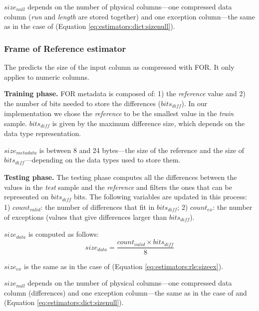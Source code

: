 \(size_{null}\) depends on the number of physical columns---one compressed data column (\textit{run} and \textit{length} are stored together) and one exception column---the same as in the case of  (Equation \ref{eq:estimators:dict:sizenull}).



\subsubsection{Frame of Reference estimator}
\label{subsub:estimator:for}

The  predicts the size of the input column as compressed with FOR. It only applies to numeric columns.

\textbf{Training phase.} FOR metadata is composed of: 1) the \textit{reference} value and 2) the number of bits needed to store the differences (\(bits_{\mathit{diff}}\)). In our implementation we chose the \textit{reference} to be the smallest value in the \textit{train} sample. \(bits_{\mathit{diff}}\) is given by the maximum difference size, which depends on the data type representation.

\(size_{metadata}\) is between 8 and 24 bytes---the size of the reference and the size of \(bits_{\mathit{diff}}\)---depending on the data types used to store them.

\textbf{Testing phase.} The testing phase computes all the differences between the values in the \textit{test} sample and the \textit{reference} and filters the ones that can be represented on \(bits_{\mathit{diff}}\) bits. The following variables are updated in this process: 1) \(count_{valid}\): the number of differences that fit in \(bits_{\mathit{diff}}\); 2) \(count_{ex}\): the number of exceptions (values that give differences larger than \(bits_{\mathit{diff}}\)).

\(size_{data}\) is computed as follows:
\begin{equation}
\label{eq:estimators:for:sizedata}
size_{data} = \frac{count_{valid} \times bits_{\mathit{diff}}}{8}
\end{equation}

\(size_{ex}\) is the same as in the case of  (Equation \ref{eq:estimators:rle:sizeex}).

\(size_{null}\) depends on the number of physical columns---one compressed data column (differences) and one exception column---the same as in the case of  and  (Equation \ref{eq:estimators:dict:sizenull}).

